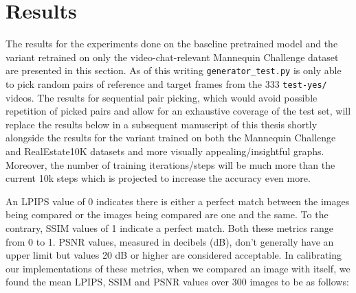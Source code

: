 \section{Results}\label{sec:results} 




The results for the experiments done on the baseline pretrained model and the variant retrained on only the video-chat-relevant Mannequin Challenge dataset are presented in this section. As of this writing \texttt{generator\_test.py} is only able to pick random pairs of reference and target frames from the 333 \texttt{test-yes/} videos. The results for sequential pair picking, which would avoid possible repetition of picked pairs and allow for an exhaustive coverage of the test set, will replace the results below in a subsequent manuscript of this thesis shortly alongside the results for the variant trained on both the Mannequin Challenge and RealEstate10K datasets and more visually appealing/insightful graphs. Moreover, the number of training iterations/steps will be much more than the current 10k steps which is projected to increase the accuracy even more. 

An LPIPS value of 0 indicates there is either a perfect match between the images being compared or the images being compared are one and the same. To the contrary, SSIM values of 1 indicate a perfect match. Both these metrics range from 0 to 1. PSNR values, measured in decibels (dB), don't generally have an upper limit but values 20 dB or higher are considered acceptable. In calibrating our implementations of these metrics, when we compared an image with itself, we found the mean LPIPS, SSIM and PSNR values over 300 images to be as follows:  



